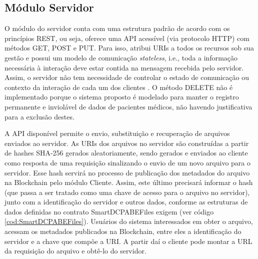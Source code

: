 \documentclass[a4paper,11pt]{article}
\begin{document}

\subsection{Módulo Servidor}



O módulo do servidor conta com uma estrutura padrão de acordo com os princípios REST, ou seja, oferece uma API acessível (via protocolo HTTP) com métodos GET, POST e PUT. Para isso, atribui URIs a todos os recursos sob sua gestão e possui um modelo de comunicação \emph{stateless}, i.e., toda a informação necessária à interação deve estar contida na mensagem recebida pelo servidor. Assim, o servidor não tem necessidade de controlar o estado de comunicação ou contexto da interação de cada um dos clientes \cite{Mark2013}.
O método DELETE não é implementado porque o sistema proposto é modelado para manter o registro permanente e inviolável de dados de pacientes médicos, não havendo justificativa para a exclusão destes. %


A API disponível permite o envio, substituição e recuperação de arquivos enviados ao servidor.
As URIs dos arquivos no servidor são construídas a partir de hashes SHA-256 gerados aleatoriamente, sendo gerados e enviados ao cliente como resposta de uma requisição sinalizando o envio de um novo arquivo para o servidor.
Esse hash servirá no processo de publicação dos metadados do arquivo na Blockchain pelo módulo Cliente. Assim, este último precisará informar o hash (que passa a ser tratado como uma chave de acesso para o arquivo no servidor), junto com a identificação do servidor e outros dados, conforme as estruturas de dados definidas no contrato SmartDCPABEFiles exigem (ver código \ref{cod:SmartDCPABEFiles}).
Usuários do sistema interessados em obter o arquivo, acessam os metadados publicados na Blockchain, entre eles a identificação do servidor e a chave que compõe a URI.
A partir daí o cliente pode montar a URL da requisição do arquivo e obtê-lo do servidor.
\end{document}

